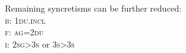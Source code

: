 \begin{frame}
\pause
\begin{smallwideitemize}
\item Remaining syncretisms can be further reduced:\\
\pause
\textsc{b: 1du.incl}\\
\textsc{f: ag=2du}\\
\textsc{i: 2sg>3s} or \textsc{3s>3s}
\end{smallwideitemize}
  

\vspace*{-.8cm}




\begin{table}[H]
\end{table}
\end{frame}
